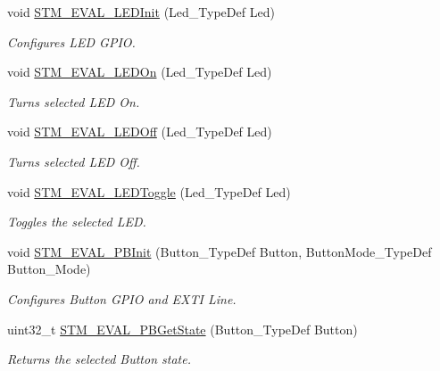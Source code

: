 \begin{DoxyCompactItemize}
\item 
void \hyperlink{group___s_t_m32_f4___d_i_s_c_o_v_e_r_y___l_o_w___l_e_v_e_l___private___functions_ga01e1a245e786705357f741c8d42cbd3a}{S\-T\-M\-\_\-\-E\-V\-A\-L\-\_\-\-L\-E\-D\-Init} (Led\-\_\-\-Type\-Def Led)
\begin{DoxyCompactList}\small\item\em Configures L\-E\-D G\-P\-I\-O. \end{DoxyCompactList}\item 
void \hyperlink{group___s_t_m32_f4___d_i_s_c_o_v_e_r_y___l_o_w___l_e_v_e_l___private___functions_gad27fa430d867e6dde94cb7896fcc42fc}{S\-T\-M\-\_\-\-E\-V\-A\-L\-\_\-\-L\-E\-D\-On} (Led\-\_\-\-Type\-Def Led)
\begin{DoxyCompactList}\small\item\em Turns selected L\-E\-D On. \end{DoxyCompactList}\item 
void \hyperlink{group___s_t_m32_f4___d_i_s_c_o_v_e_r_y___l_o_w___l_e_v_e_l___private___functions_gab9ab7deafd606e72d72580ec974b7757}{S\-T\-M\-\_\-\-E\-V\-A\-L\-\_\-\-L\-E\-D\-Off} (Led\-\_\-\-Type\-Def Led)
\begin{DoxyCompactList}\small\item\em Turns selected L\-E\-D Off. \end{DoxyCompactList}\item 
void \hyperlink{group___s_t_m32_f4___d_i_s_c_o_v_e_r_y___l_o_w___l_e_v_e_l___private___functions_ga5b1ccd57cf505c1d41440e62a845e4a9}{S\-T\-M\-\_\-\-E\-V\-A\-L\-\_\-\-L\-E\-D\-Toggle} (Led\-\_\-\-Type\-Def Led)
\begin{DoxyCompactList}\small\item\em Toggles the selected L\-E\-D. \end{DoxyCompactList}\item 
void \hyperlink{group___s_t_m32_f4___d_i_s_c_o_v_e_r_y___l_o_w___l_e_v_e_l___private___functions_ga1cdc19fe328ddcd17bf50fcb62d78369}{S\-T\-M\-\_\-\-E\-V\-A\-L\-\_\-\-P\-B\-Init} (Button\-\_\-\-Type\-Def Button, Button\-Mode\-\_\-\-Type\-Def Button\-\_\-\-Mode)
\begin{DoxyCompactList}\small\item\em Configures Button G\-P\-I\-O and E\-X\-T\-I Line. \end{DoxyCompactList}\item 
uint32\-\_\-t \hyperlink{group___s_t_m32_f4___d_i_s_c_o_v_e_r_y___l_o_w___l_e_v_e_l___private___functions_ga812ee2a84aaed235587ac81eb9269442}{S\-T\-M\-\_\-\-E\-V\-A\-L\-\_\-\-P\-B\-Get\-State} (Button\-\_\-\-Type\-Def Button)
\begin{DoxyCompactList}\small\item\em Returns the selected Button state. \end{DoxyCompactList}\end{DoxyCompactItemize}


